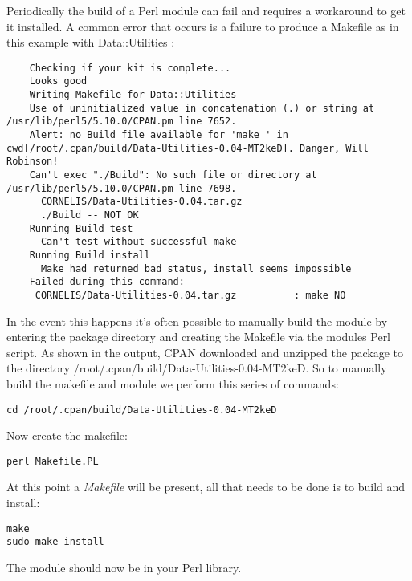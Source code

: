 \documentclass[12pt]{article}
\begin{document}
Periodically the build of a Perl module can fail and requires a workaround to get it installed. A common error that occurs is a failure to produce a Makefile as in this example with Data::Utilities :

\begin{verbatim}
	Checking if your kit is complete...
	Looks good
	Writing Makefile for Data::Utilities
	Use of uninitialized value in concatenation (.) or string at /usr/lib/perl5/5.10.0/CPAN.pm line 7652.
	Alert: no Build file available for 'make ' in cwd[/root/.cpan/build/Data-Utilities-0.04-MT2keD]. Danger, Will Robinson!
	Can't exec "./Build": No such file or directory at /usr/lib/perl5/5.10.0/CPAN.pm line 7698.
	  CORNELIS/Data-Utilities-0.04.tar.gz
	  ./Build -- NOT OK
	Running Build test
	  Can't test without successful make
	Running Build install
	  Make had returned bad status, install seems impossible
	Failed during this command:
	 CORNELIS/Data-Utilities-0.04.tar.gz          : make NO
\end{verbatim} 

In the event this happens it's often possible to manually build the module by entering the package directory and creating the Makefile via the modules Perl script. As shown in the output, CPAN downloaded and unzipped the package to the directory /root/.cpan/build/Data-Utilities-0.04-MT2keD. So to manually build the makefile and module we perform this series of commands:

\begin{verbatim}
cd /root/.cpan/build/Data-Utilities-0.04-MT2keD
\end{verbatim}

Now create the makefile:

\begin{verbatim}
perl Makefile.PL
\end{verbatim}

At this point a {\it Makefile} will be present, all that needs to be done is to build and install:

\begin{verbatim}
make
sudo make install
\end{verbatim}

The module should now be in your Perl library. 
\end{document}
